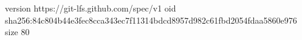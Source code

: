 version https://git-lfs.github.com/spec/v1
oid sha256:84c804b44e3fec8cca343ec7f11314bdcd8957d982c61fbd2054fdaa5860e976
size 80
